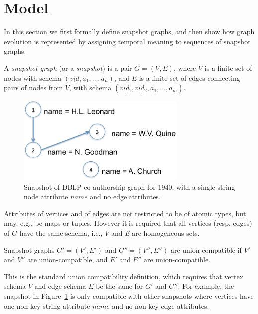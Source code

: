 \section{Model}
\label{sec:model}

In this section we first formally define snapshot graphs, and then
show how graph evolution is represented by assigning temporal meaning
to sequences of snapshot graphs.

\begin{definition}[Snapshot]
A {\em snapshot graph} (or a {\em snapshot}) is a pair $G = (V,E)$,
where $V$ is a finite set of nodes with schema $(\underline{vid},
a_1, \ldots, a_n)$, and $E$ is a finite set of edges connecting
pairs of nodes from $V$, with schema $(\underline{vid_1},
\underline{vid_2}, a_1, \ldots, a_m)$.
\label{def:sg} 
\end{definition}

\begin{figure}
\includegraphics[width=3.2in]{figs/snapshot.pdf}
\caption{Snapshot of DBLP co-authorship graph for 1940, with a single
  string node attribute $name$ and no edge attributes.}
\label{fig:sg}
\end{figure}

Attributes of vertices and of edges are not restricted to be of atomic
types, but may, e.g., be maps or tuples. However it is required that
all vertices (resp. edges) of $G$ have the same schema, i.e., $V$ and
$E$ are homogeneous sets.

\begin{definition} 
Snapshot graphs $G' = (V', E')$ and $G'' = (V'', E'')$ are
union-compatible if $V'$ and $V''$ are union-compatible, and $E'$ and
$E''$ are union-compatible.
\label{def:scompat}
\end{definition}

This is the standard union compatibility definition, which requires
that vertex schema $V$ and edge schema $E$ be the same for $G'$ and
$G''$.  For example, the snapshot in Figure~\ref{fig:sg} is only
compatible with other snapshots where vertices have one non-key string
attribute $name$ and no non-key edge attributes.

